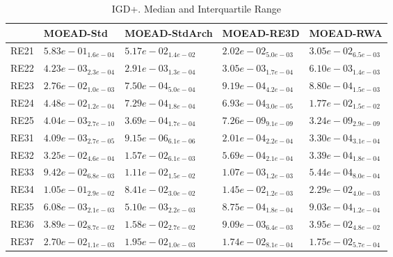 \documentclass{article}
\begin{document}
\begin{table}
\caption{IGD+. Median and Interquartile Range}
\label{table: IGD+}
\centering
\begin{scriptsize}
\begin{tabular}{lllll}
\hline & MOEAD-Std & MOEAD-StdArch & MOEAD-RE3D &  MOEAD-RWA\\
\hline 
RE21 & $  5.83e-01_{ 1.6e-04}$ & $  5.17e-02_{ 1.4e-02}$ & \cellcolor{gray95}$  2.02e-02_{ 5.0e-03}$ & \cellcolor{gray25}$  3.05e-02_{ 6.5e-03}$ \\
RE22 & $  4.23e-03_{ 2.3e-04}$ & \cellcolor{gray95}$  2.91e-03_{ 1.3e-04}$ & \cellcolor{gray25}$  3.05e-03_{ 1.7e-04}$ & $  6.10e-03_{ 1.4e-03}$ \\
RE23 & $  2.76e-02_{ 1.0e-03}$ & \cellcolor{gray95}$  7.50e-04_{ 5.0e-04}$ & $  9.19e-04_{ 4.2e-04}$ & \cellcolor{gray25}$  8.80e-04_{ 1.5e-03}$ \\
RE24 & $  4.48e-02_{ 1.2e-04}$ & \cellcolor{gray25}$  7.29e-04_{ 1.8e-04}$ & \cellcolor{gray95}$  6.93e-04_{ 3.0e-05}$ & $  1.77e-02_{ 1.5e-02}$ \\
RE25 & $  4.04e-03_{ 2.7e-10}$ & $  3.69e-04_{ 1.7e-04}$ & \cellcolor{gray25}$  7.26e-09_{ 9.1e-09}$ & \cellcolor{gray95}$  3.24e-09_{ 2.9e-09}$ \\
RE31 & $  4.09e-03_{ 2.7e-05}$ & \cellcolor{gray95}$  9.15e-06_{ 6.1e-06}$ & \cellcolor{gray25}$  2.01e-04_{ 2.2e-04}$ & $  3.30e-04_{ 3.1e-04}$ \\
RE32 & $  3.25e-02_{ 4.6e-04}$ & $  1.57e-02_{ 6.1e-03}$ & \cellcolor{gray25}$  5.69e-04_{ 2.1e-04}$ & \cellcolor{gray95}$  3.39e-04_{ 1.8e-04}$ \\
RE33 & $  9.42e-02_{ 6.8e-03}$ & $  1.11e-02_{ 1.5e-02}$ & \cellcolor{gray25}$  1.07e-03_{ 1.2e-03}$ & \cellcolor{gray95}$  5.44e-04_{ 8.0e-04}$ \\
RE34 & $  1.05e-01_{ 2.9e-02}$ & $  8.41e-02_{ 3.0e-02}$ & \cellcolor{gray95}$  1.45e-02_{ 1.2e-03}$ & \cellcolor{gray25}$  2.29e-02_{ 4.0e-03}$ \\
RE35 & $  6.08e-03_{ 2.1e-03}$ & $  5.10e-03_{ 2.2e-03}$ & \cellcolor{gray95}$  8.75e-04_{ 1.8e-04}$ & \cellcolor{gray25}$  9.03e-04_{ 1.2e-04}$ \\
RE36 & $  3.89e-02_{ 8.7e-02}$ & \cellcolor{gray25}$  1.58e-02_{ 2.7e-02}$ & \cellcolor{gray95}$  9.09e-03_{ 6.4e-03}$ & $  3.95e-02_{ 4.8e-02}$ \\
RE37 & $  2.70e-02_{ 1.1e-03}$ & $  1.95e-02_{ 1.0e-03}$ & \cellcolor{gray95}$  1.74e-02_{ 8.1e-04}$ & \cellcolor{gray25}$  1.75e-02_{ 5.7e-04}$ \\

\end{tabular}
\end{scriptsize}
\end{table}
\end{document}
